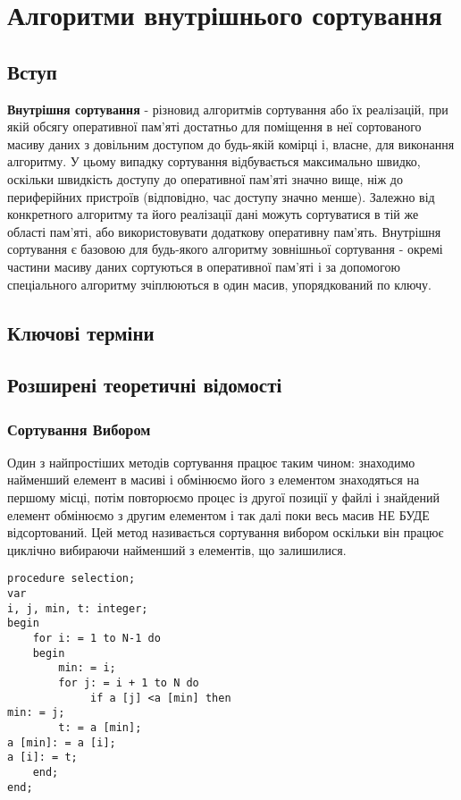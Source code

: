 \chapter{Алгоритми внутрішнього сортування}

\section{Вступ}
\nopagebreak[4]
\textbf{Внутрішня сортування} - різновид алгоритмів сортування або їх реалізацій, при якій обсягу оперативної пам'яті достатньо для поміщення в неї сортованого масиву даних з довільним доступом до будь-якій комірці і, власне, для виконання алгоритму. У цьому випадку сортування відбувається максимально швидко, оскільки швидкість доступу до оперативної пам'яті значно вище, ніж до периферійних пристроїв (відповідно, час доступу значно менше). Залежно від конкретного алгоритму та його реалізації дані можуть сортуватися в тій же області пам'яті, або використовувати додаткову оперативну пам'ять. Внутрішня сортування є базовою для будь-якого алгоритму зовнішньої сортування - окремі частини масиву даних сортуються в оперативної пам'яті і за допомогою спеціального алгоритму зчіплюються в один масив, упорядкований по ключу.

\section{Ключові терміни}
\nopagebreak[4]




\section{Розширені теоретичні відомості}
\nopagebreak[4]

\subsection{Сортування Вибором}

Один з найпростіших методів сортування працює таким чином: знаходимо найменший елемент в масиві і обмінюємо його з елементом знаходяться на першому місці, потім повторюємо процес із другої позиції у файлі і знайдений елемент обмінюємо з другим елементом і так далі поки весь масив НЕ БУДЕ відсортований. Цей метод називається сортування вибором оскільки він працює циклічно вибираючи найменший з елементів, що залишилися.


\begin{lstlisting}[label=code:vyb,caption=Сортування вибором]
procedure selection;
var
i, j, min, t: integer;
begin
    for i: = 1 to N-1 do
    begin
        min: = i;
        for j: = i + 1 to N do
             if a [j] <a [min] then
min: = j;
        t: = a [min];
a [min]: = a [i];
a [i]: = t;
    end;
end;
\end{lstlisting}

